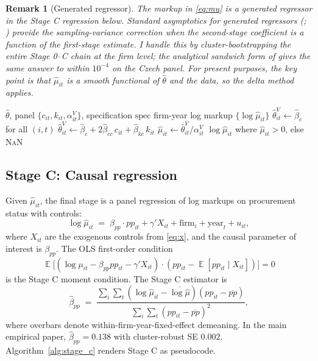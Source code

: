 \documentclass[11pt]{article}
\newtheorem{remark}{Remark}
\DeclareMathOperator{\E}{\mathbb{E}}
\begin{document}
\begin{remark}[Generated regressor]\label{rem:gen_reg}
The markup in \eqref{eq:mu} is a \emph{generated regressor} in the Stage C regression below. Standard asymptotics for generated regressors (\citealt{Pagan1984}; \citealt{MurphyTopel1985}) provide the sampling-variance correction when the second-stage coefficient is a function of the first-stage estimate. I handle this by cluster-bootstrapping the entire Stage 0--C chain at the firm level; the analytical sandwich form of \citet{ACH2012} gives the same answer to within $10^{-4}$ on the Czech panel. For present purposes, the key point is that $\hat\mu_{it}$ is a smooth functional of $\hat\theta$ and the data, so the delta method applies.
\end{remark}

\begin{algorithm}[htbp]
\caption{Stage B --- Markup generation}\label{alg:stage_b}
\begin{algorithmic}[1]
\INPUT $\hat\theta$, panel $\{c_{it},k_{it},\alpha^V_{it}\}$, specification $\text{spec}$
\OUTPUT firm-year log markup $\{\log\hat\mu_{it}\}$
    \State $\hat\theta^V_{it} \gets \hat\beta_c$ for all $(i,t)$
    \State $\hat\theta^V_{it} \gets \hat\beta_c + 2\hat\beta_{cc}\,c_{it} + \hat\beta_{kc}\,k_{it}$ 
\EndIf
\State $\hat\mu_{it} \gets \hat\theta^V_{it}/\alpha^V_{it}$ 
\State \Return $\log\hat\mu_{it}$ where $\hat\mu_{it}>0$, else \textsc{NaN}
\end{algorithmic}
\end{algorithm}

\subsection{Stage C: Causal regression}

Given $\hat\mu_{it}$, the final stage is a panel regression of log markups on procurement status with controls:
\begin{equation}\label{eq:stagec}
\log\hat\mu_{it} \;=\; \beta_{pp}\cdot pp_{it} + \gamma'X_{it} + \text{firm}_i + \text{year}_t + u_{it},
\end{equation}
where $X_{it}$ are the exogenous controls from \eqref{eq:x}, and the causal parameter of interest is $\beta_{pp}$. The OLS first-order condition
\begin{equation}\label{eq:gmm_reg}
\E\bigl[(\log\mu_{it} - \beta_{pp} pp_{it} - \gamma'X_{it})\cdot (pp_{it} - \E[pp_{it}\mid X_{it}])\bigr] = 0
\end{equation}
is the Stage C moment condition. The Stage C estimator is
\begin{equation}\label{eq:beta_pp_hat}
\hat\beta_{pp} \;=\; \frac{\sum_i\sum_t(\log\hat\mu_{it}-\overline{\log\hat\mu})(pp_{it}-\overline{pp})}{\sum_i\sum_t(pp_{it}-\overline{pp})^2},
\end{equation}
where overbars denote within-firm-year-fixed-effect demeaning. In the main empirical paper, $\hat\beta_{pp} = 0.138$ with cluster-robust SE $0.002$. Algorithm~\ref{alg:stage_c} renders Stage C as pseudocode.
\end{document}
